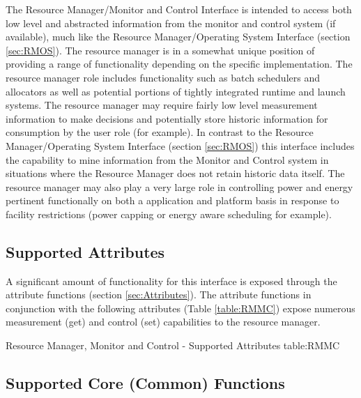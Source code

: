 The Resource Manager/Monitor and Control Interface is intended to access both low level and abstracted information from the monitor and control system (if available), much like the Resource Manager/Operating System Interface (section \ref{sec:RMOS}).
The resource manager is in a somewhat unique position of providing a range of functionality depending on the specific implementation.
The resource manager role includes functionality such as batch schedulers and allocators as well as potential portions of tightly integrated runtime and launch systems.
The resource manager may require fairly low level measurement information to make decisions and potentially store historic information for consumption by the user role (for example). 
In contrast to the Resource Manager/Operating System Interface (section \ref{sec:RMOS}) this interface includes the capability to mine information from the Monitor and Control system in situations where the Resource Manager does not retain historic data itself.
The resource manager may also play a very large role in controlling power and energy pertinent functionally on both a application and platform basis in response to facility restrictions (power capping or energy aware scheduling for example).

\subsection{Supported Attributes}\label{sec:RMMCAttributes}
A significant amount of functionality for this interface is exposed through the attribute functions (section \ref{sec:Attributes}).
The attribute functions in conjunction with the following attributes (Table \ref{table:RMMC}) expose numerous measurement  (get) and control (set) capabilities to the resource manager.

\begin{attributetable}{Resource Manager, Monitor and Control - Supported Attributes }{table:RMMC}
	\aPstateDesc
	\aCstateDesc
	\aCstateLimitDesc
	\aSstateDesc
	\aPowerDesc
	\aMinPowerDesc
	\aMaxPowerDesc
	\aFreqDesc
	\aFreqLimitMinDesc
	\aFreqLimitMaxDesc
	\aEnergyDesc
	\aTempDesc
\end{attributetable}


\subsection{Supported Core (Common) Functions}\label{sec:RMMCSupportedCommon}

